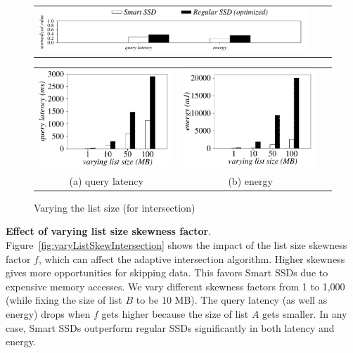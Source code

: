\begin{figure}[tbp]
  \centering
    \begin{tabular}{ccc}
 \includegraphics[width=0.52\columnwidth]{figures/banner2.pdf}
\end{tabular}
\vspace{-0.1cm}
\renewcommand{\tabcolsep}{0.1mm}
  \begin{tabular}{ccc}
 \includegraphics[width=0.5\columnwidth]{figures/Intersection-time-VaryListLen-eps-converted-to.pdf}&
  \includegraphics[width=0.5\columnwidth]{figures/Intersection-energy-VaryListLen-eps-converted-to.pdf}\\
  (a) query latency & (b) energy
\end{tabular}
  \caption{Varying the list size (for intersection)}
  \label{fig:varyListSizeIntersection}
 \end{figure}



\textbf{Effect of varying list size skewness factor}.
Figure~\ref{fig:varyListSkewIntersection} shows the impact of the list size skewness factor $f$, which can affect the adaptive intersection algorithm.
Higher skewness gives more opportunities for skipping data. This favors Smart SSDs due to expensive memory accesses.
We vary different skewness factors from 1 to 1,000 (while fixing the size of list $B$ to be 10 MB).
The query latency (as well as energy) drops when $f$ gets higher because the size of list $A$ gets smaller. In any case, Smart SSDs outperform regular SSDs significantly in both latency and energy.

